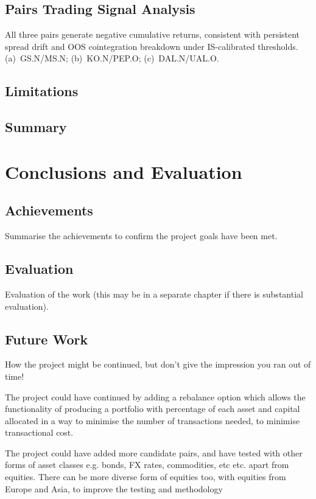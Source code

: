 \documentclass[a4paper]{report}
\begin{document}
\section{Pairs Trading Signal Analysis}

All three pairs generate negative cumulative returns, consistent with persistent
spread drift and OOS cointegration breakdown under IS-calibrated thresholds.
(a)~GS.N/MS.N; (b)~KO.N/PEP.O; (c)~DAL.N/UAL.O.

\section{Limitations}

\section{Summary}

\chapter{Conclusions and Evaluation}
\label{chap:conclusions}
\section{Achievements}
Summarise the achievements to confirm the project goals have been met.
\section{Evaluation}
Evaluation of the work (this may be in a separate chapter if there is substantial evaluation).

\section{Future Work}
How the project might be continued, but don't give the impression you ran out of time!

The project could have continued by adding a rebalance option which allows the functionality of producing a portfolio with percentage of each asset and capital allocated in a way to minimise the number of transactions needed, to minimise transactional cost.

The project could have added more candidate pairs, and have tested with other forms of asset classes e.g. bonds, FX rates, commodities, etc etc. apart from equities. There can be more diverse form of equities too, with equities from Europe and Asia, to improve the testing and methodology
\end{document}
